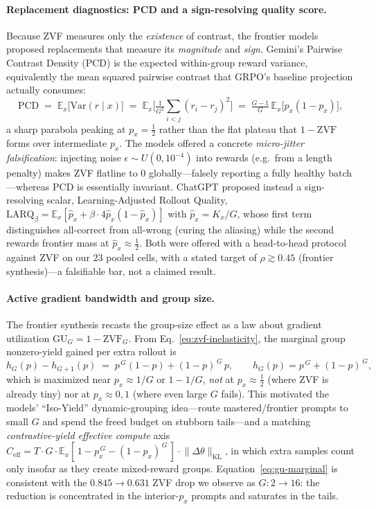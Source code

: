 \paragraph{Replacement diagnostics: PCD and a sign-resolving quality score.}
Because ZVF measures only the \emph{existence} of contrast, the frontier
models proposed replacements that measure its \emph{magnitude} and
\emph{sign}. Gemini's Pairwise Contrast Density (PCD) is the expected
within-group reward variance, equivalently the mean squared pairwise
contrast that GRPO's baseline projection actually consumes:
\begin{equation}
  \mathrm{PCD}
  \;=\; \mathbb{E}_{x}\!\big[\mathrm{Var}(r\mid x)\big]
  \;=\; \mathbb{E}_{x}\!\Big[\tfrac{1}{G^2}\!\sum_{i<j}(r_i-r_j)^2\Big]
  \;=\; \tfrac{G-1}{G}\,\mathbb{E}_{x}\!\big[p_x(1-p_x)\big],
  \label{eq:pcd}
\end{equation}
a sharp parabola peaking at $p_x=\tfrac12$ rather than the flat plateau
that $1-\mathrm{ZVF}$ forms over intermediate $p_x$. The models offered a
concrete \emph{micro-jitter falsification}: injecting noise
$\epsilon\sim U(0,10^{-4})$ into rewards (e.g.\ from a length penalty)
makes ZVF flatline to $0$ globally---falsely reporting a fully healthy
batch---whereas PCD is essentially invariant. ChatGPT proposed instead a
sign-resolving scalar, Learning-Adjusted Rollout Quality,
$\mathrm{LARQ}_\beta=\mathbb{E}_x[\hat p_x+\beta\cdot4\hat p_x(1-\hat p_x)]$
with $\hat p_x=K_x/G$, whose first term distinguishes all-correct from
all-wrong (curing the aliasing) while the second rewards frontier mass at
$\hat p_x\approx\tfrac12$. Both were offered with a head-to-head protocol
against ZVF on our $23$ pooled cells, with a stated target of
$\rho\gtrsim0.45$ (frontier synthesis)---a falsifiable bar, not a claimed
result.

\paragraph{Active gradient bandwidth and group size.}
The frontier synthesis recasts the group-size effect as a law about
gradient utilization $\mathrm{GU}_G=1-\mathrm{ZVF}_G$. From
Eq.~\eqref{eq:zvf-inelasticity}, the marginal group nonzero-yield gained
per extra rollout is
\begin{equation}
  h_G(p)-h_{G+1}(p) \;=\; p^{\,G}(1-p) + (1-p)^{\,G}\,p,
  \qquad h_G(p)=p^{\,G}+(1-p)^{\,G},
  \label{eq:gu-marginal}
\end{equation}
which is maximized near $p_x\approx 1/G$ or $1-1/G$, \emph{not} at
$p_x\approx\tfrac12$ (where ZVF is already tiny) nor at $p_x\approx 0,1$
(where even large $G$ fails). This motivated the models' ``Iso-Yield''
dynamic-grouping idea---route mastered/frontier prompts to small $G$ and
spend the freed budget on stubborn tails---and a matching
\emph{contrastive-yield effective compute} axis
$C_{\mathrm{eff}} = T\cdot G\cdot \mathbb{E}_x[\,1-p_x^{\,G}-(1-p_x)^{\,G}\,]\cdot\lVert\Delta\theta\rVert_{\mathrm{KL}}$,
in which extra samples count only insofar as they create mixed-reward
groups. Equation~\eqref{eq:gu-marginal} is consistent with the
$0.845\to0.631$ ZVF drop we observe as $G:2\to16$: the reduction is
concentrated in the interior-$p_x$ prompts and saturates in the tails.

